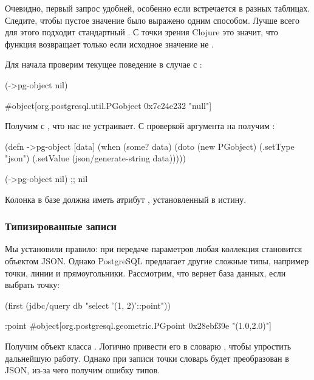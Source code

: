 Очевидно, первый запрос удобней, особенно если  встречается в разных таблицах. Следите, чтобы пустое значение было выражено одним способом. Лучше всего для этого подходит стандартный . С точки зрения Clojure это значит, что функция  возвращает  только если исходное значение не .

Для начала проверим текущее поведение в случае с :

\begin{english}
  \begin{clojure}
(->pg-object nil)

#object[org.postgresql.util.PGobject 0x7c24e232 "null"]
  \end{clojure}
\end{english}

Получим  с , что нас не устраивает. С проверкой аргумента на  получим :

\begin{english}
  \begin{clojure}
(defn ->pg-object [data]
  (when (some? data)
    (doto (new PGobject)
      (.setType "json")
      (.setValue (json/generate-string data)))))

(->pg-object nil) ;; nil
  \end{clojure}
\end{english}

Колонка в базе должна иметь атрибут , установленный в истину.

\subsubsection{Типизированные записи}

Мы установили правило: при передаче параметров любая коллекция становится объектом JSON. Однако PostgreSQL предлагает другие сложные типы, например точки, линии и прямоугольники. Рассмотрим, что вернет база данных, если выбрать точку:

\begin{english}
  \begin{clojure}
(first (jdbc/query db "select '(1, 2)'::point"))

{:point #object[org.postgresql.geometric.PGpoint 0x28ebf39e "(1.0,2.0)"]}
  \end{clojure}
\end{english}

Получим объект класса . Логично привести его в словарю , чтобы упростить дальнейшую работу. Однако при записи точки словарь будет преобразован в JSON, из-за чего получим ошибку типов.

